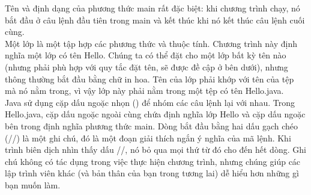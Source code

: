 \indent Tên và định dạng của phương thức main rất đặc biệt: khi chương trình chạy, nó bắt đầu ở câu lệnh đầu tiên trong main và kết thúc khi nó kết thúc câu lệnh cuối cùng. \\
\indent Một lớp là một tập hợp các phương thức và thuộc tính. Chương trình này định nghĩa một lớp có tên {\ttfamily Hello}. Chúng ta có thể đặt cho một lớp bất kỳ tên nào (nhưng phải phù hợp với quy tắc đặt tên, sẽ được đề cập ở bên dưới), nhưng thông thường bắt đầu bằng chữ in hoa. Tên của lớp phải khớp với tên của tệp mà nó nằm trong, vì vậy lớp này phải nằm trong một tệp có tên {\ttfamily Hello.java}.\\
\indent Java sử dụng cặp dấu ngoặc nhọn ({}) để nhóm các câu lệnh lại với nhau. Trong {\ttfamily Hello.java}, cặp dấu ngoặc ngoài cùng chứa định nghĩa lớp {\ttfamily Hello} và cặp dấu ngoặc bên trong định nghĩa phương thức {\ttfamily main}.
Dòng bắt đầu bằng hai dấu gạch chéo (//) là một ghi chú, đó là một đoạn giải thích ngắn ý nghĩa của mã lệnh. Khi trình biên dịch nhìn thấy dấu //, nó bỏ qua mọi thứ từ đó cho đến hết dòng. Ghi chú không có tác dụng trong việc thực hiện chương trình, nhưng chúng giúp các lập trình viên khác (và bản thân của bạn trong tương lai) dễ hiểu hơn những gì bạn muốn làm.
